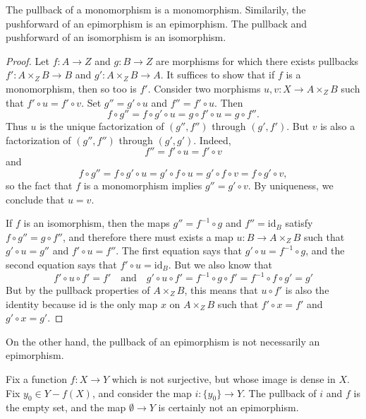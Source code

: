 \begin{lemma}
    The pullback of a monomorphism is a monomorphism. Similarily, the pushforward of an epimorphism is an epimorphism. The pullback and pushforward of an isomorphism is an isomorphism.
\end{lemma}
\begin{proof}
    Let $f: A \to Z$ and $g: B \to Z$ are morphisms for which there exists pullbacks $f': A \times_Z B \to B$ and $g': A \times_Z B \to A$. It suffices to show that if $f$ is a monomorphism, then so too is $f'$. Consider two morphisms $u,v: X \to A \times_Z B$ such that $f' \circ u = f' \circ v$. Set $g'' = g' \circ u$ and $f'' = f' \circ u$. Then
    \[ f \circ g'' = f \circ g' \circ u = g \circ f' \circ u = g \circ f''. \]
    Thus $u$ is the unique factorization of $(g'',f'')$ through $(g',f')$. But $v$ is also a factorization of $(g'',f'')$ through $(g',g')$. Indeed,
    \[ f'' = f' \circ u = f' \circ v \]
    and
    \[ f \circ g'' = f \circ g' \circ u = g' \circ f \circ u = g' \circ f \circ v = f \circ g' \circ v, \]
    so the fact that $f$ is a monomorphism implies $g'' = g' \circ v$. By uniqueness, we conclude that $u = v$.

    If $f$ is an isomorphism, then the maps $g'' = f^{-1} \circ g$ and $f'' = \text{id}_B$ satisfy $f \circ g'' = g \circ f''$, and therefore there must exists a map $u: B \to A \times_Z B$ such that $g' \circ u = g''$ and $f' \circ u = f''$. The first equation says that $g' \circ u = f^{-1} \circ g$, and the second equation says that $f' \circ u = \text{id}_B$. But we also know that
    \[ f' \circ u \circ f' = f'\quad\text{and}\quad g' \circ u \circ f' = f^{-1} \circ g \circ f' = f^{-1} \circ f \circ g' = g' \]
    But by the pullback properties of $A \times_Z B$, this means that $u \circ f'$ is also the identity because $\text{id}$ is the only map $x$ on $A \times_Z B$ such that $f' \circ x = f'$ and $g' \circ x = g'$.
\end{proof}

On the other hand, the pullback of an epimorphism is not necessarily an epimorphism.

\begin{example}
    Fix a function $f:X \to Y$ which is not surjective, but whose image is dense in $X$. Fix $y_0 \in Y - f(X)$, and consider the map $i: \{ y_0 \} \to Y$. The pullback of $i$ and $f$ is the empty set, and the map $\emptyset \to Y$ is certainly not an epimorphism.
\end{example}


